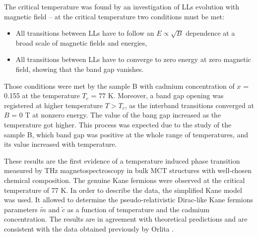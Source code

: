 \documentclass[titlepage,a4paper]{book}
\begin{document}
The critical temperature was found by an investigation of LLs evolution with magnetic field -- at the critical temperature two conditions must be met: 
\begin{itemize}
\item All transitions between LLs have to follow an $E \propto \sqrt{B}$ dependence at a broad scale of magnetic fields and energies,
\item All transitions between LLs have to converge to zero energy at zero magnetic field, showing that the band gap vanishes.
\end{itemize}

Those conditions were met by the sample B with cadmium concentration of $x$ = 0.155 at the temperature $T_c$ = 77 K. Moreover, a band gap opening was registered at higher temperature $T > T_c$, as the interband transitions converged at $B$ = 0 T at nonzero energy. The value of the bang gap increased as the temperature got higher. This process was expected due to the study of the sample B, which band gap was positive at the whole range of temperatures, and its value increased with temperature.  

These results are the first evidence of a temperature induced phase transition measured by THz magnetospectroscopy in bulk MCT structures with well-chosen chemical composition. The genuine Kane fermions were observed at the critical temperature of 77 K. In order to describe the data, the simplified Kane model was used. It allowed to determine the pseudo-relativistic Dirac-like Kane fermions parameters $\tilde{m}$ and $\tilde{c}$ as a function of temperature and the cadmium concentration. The results are in agreement with theoretical predictions and are consistent with the data obtained previously by Orlita \cite{Orlita_MCT}.
\end{document}
